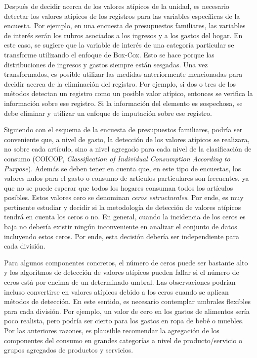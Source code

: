 \documentclass[
  12pt,
]{book}
\begin{document}
Después de decidir acerca de los valores atípicos de la unidad, es necesario detectar los valores atípicos de los registros para las variables específicas de la encuesta. Por ejemplo, en una encuesta de presupuestos familiares, las variables de interés serán los rubros asociados a los ingresos y a los gastos del hogar. En este caso, se sugiere que la variable de interés de una categoría particular se transforme utilizando el enfoque de Box-Cox. Esto se hace porque las distribuciones de ingresos y gastos siempre están sesgadas. Una vez transformados, es posible utilizar las medidas anteriormente mencionadas para decidir acerca de la eliminación del registro. Por ejemplo, si dos o tres de los métodos detectan un registro como un posible valor atípico, entonces se verifica la información sobre ese registro. Si la información del elemento es sospechosa, se debe eliminar y utilizar un enfoque de imputación sobre ese registro.

Siguiendo con el esquema de la encuesta de presupuestos familiares, podría ser conveniente que, a nivel de gasto, la detección de los valores atípicos se realizara, no sobre cada artículo, sino a nivel agregado para cada nivel de la clasificación de consumo (COICOP, \emph{Classification of Individual Consumption According to Purpose}). Además se deben tener en cuenta que, en este tipo de encuestas, los valores nulos para el gasto o consumo de artículos particulares son frecuentes, ya que no se puede esperar que todos los hogares consuman todos los artículos posibles. Estos valores cero se denominan \emph{ceros estructurales}. Por ende, es muy pertinente estudiar y decidir si la metodología de detección de valores atípicos tendrá en cuenta los ceros o no. En general, cuando la incidencia de los ceros es baja no debería existir ningún inconveniente en analizar el conjunto de datos incluyendo estos ceros. Por ende, esta decisión debería ser independiente para cada división.

Para algunos componentes concretos, el número de ceros puede ser bastante alto y los algoritmos de detección de valores atípicos pueden fallar si el número de ceros está por encima de un determinado umbral. Las observaciones podrían incluso convertirse en valores atípicos debido a los ceros cuando se aplican métodos de detección. En este sentido, es necesario contemplar umbrales flexibles para cada división. Por ejemplo, un valor de cero en los gastos de alimentos sería poco realista, pero podría ser cierto para los gastos en ropa de bebé o muebles. Por las anteriores razones, es plausible recomendar la agregación de los componentes del consumo en grandes categorías a nivel de producto/servicio o grupos agregados de productos y servicios.
\end{document}
